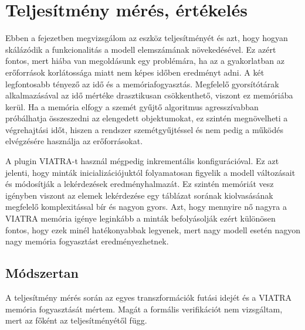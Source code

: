 \chapter{Teljesítmény mérés, értékelés}

Ebben a fejezetben megvizsgálom az eszköz teljesítményét és azt, hogy hogyan skálázódik a funkcionalitás a modell elemszámának növekedésével. Ez azért fontos, mert  hiába van megoldásunk egy problémára, ha az a gyakorlatban az erőforrások korlátossága miatt nem képes időben eredményt adni. A két legfontosabb tényező az idő és a memóriafogyasztás. Megfelelő gyorsítótárak alkalmazásával az idő mértéke drasztikusan csökkenthető, viszont ez memóriába kerül. Ha a memória elfogy a szemét gyűjtő algoritmus agresszívabban próbálhatja összeszedni az elengedett objektumokat, ez szintén megnövelheti a végrehajtási időt, hiszen a rendszer szemétgyűjtéssel és nem pedig a működés elvégzésére használja az erőforrásokat.

A plugin VIATRA-t használ mégpedig inkrementális konfigurációval. Ez azt jelenti, hogy minták inicializációjuktól folyamatosan figyelik a modell változásait és módosítják a lekérdezések eredményhalmazát. Ez szintén memóriát vesz igényben viszont az elemek lekérdezése egy táblázat sorának kiolvasásának megfelelő komplexitással bír és nagyon gyors. Azt, hogy mennyire nő nagyra a VIATRA memória igénye leginkább a minták befolyásolják ezért különösen fontos, hogy ezek minél hatékonyabbak legyenek, mert nagy modell esetén nagyon nagy memória fogyasztást eredményezhetnek.

\section{Módszertan}

A teljesítmény mérés során az egyes transzformációk futási idejét és a VIATRA memória fogyasztását mértem. Magát a formális verifikációt  nem vizsgáltam, mert az főként az \uppaal teljesítményétől függ.



